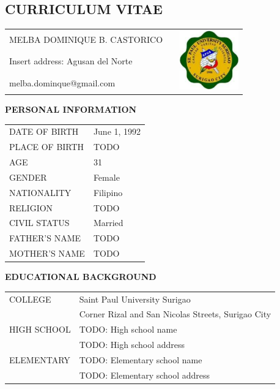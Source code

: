 \documentclass[12pt]{report}
\newcommand{\authora}{
    Melba Dominique B. Castorico %
}
\begin{document}
\begin{spacing}{1.55}

\chapter*{CURRICULUM VITAE}

\begin{tabularx}{\linewidth}{@{}lXr}
    \MakeUppercase{\authora} && \multirow{3}{*}{\includegraphics[width=1in]{img/burdeos}} \\ %
    Insert address: Agusan del Norte && \\
    melba.dominque@gmail.com && \\
\end{tabularx}

\vspace{20pt}

\textbf{PERSONAL INFORMATION}

\vspace{-10pt}
\hrulefill

\begin{tabular}{@{}l@{ : }l}
    DATE OF BIRTH & June 1, 1992 \\
    PLACE OF BIRTH & TODO \\
    AGE & 31 \\
    GENDER & Female \\
    NATIONALITY & Filipino \\
    RELIGION & TODO \\
    CIVIL STATUS & Married \\
    FATHER'S NAME & TODO \\
    MOTHER'S NAME & TODO \\
\end{tabular}

\vspace{20pt}

\textbf{EDUCATIONAL BACKGROUND}

\vspace{-10pt}
\hrulefill

\begin{tabular}{@{}l@{ : }l}
    COLLEGE & Saint Paul University Surigao \\
    & Corner Rizal and San Nicolas Streets, Surigao City \\
    HIGH SCHOOL & TODO: High school name \\
    & TODO: High school address \\
    ELEMENTARY & TODO: Elementary school name \\
    & TODO: Elementary school address \\
\end{tabular}

\end{spacing}
\end{document}
